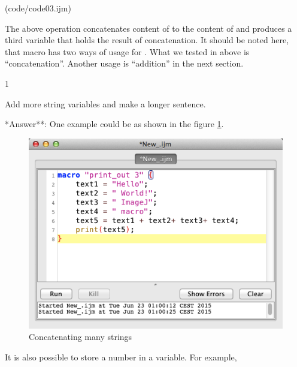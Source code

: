 (code/code03.ijm)

The above operation concatenates content of  to the content of  and produces a third variable  that holds the result of concatenation. It should be noted here, that macro has two ways of usage for \ilcom{+}. What we tested in above is ``concatenation''. Another usage is ``addition'' in the next section.

\begin{indentexercise}
{1}
\item Add more string variables and make a longer sentence.\\

\item **Answer**: One example could be as shown in the figure \ref{var_stringconcat}. 
\begin{figure}[htbp]
\begin{center}
\includegraphics[scale=0.6]{fig/var_stringContcat.png}
\caption{Concatenating many strings} \label{var_stringconcat}
\end{center}
\end{figure}

\end{indentexercise}

It is also possible to store a number in a variable. For example, \\